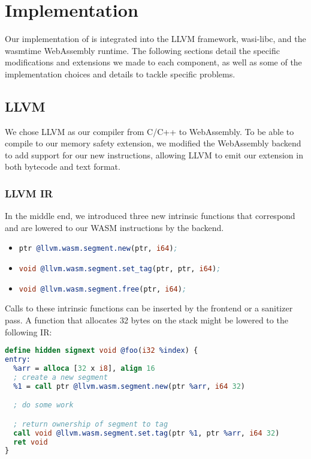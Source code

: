 \chapter{Implementation}
\label{ch:implementation}

Our implementation of \projectname{} is integrated into the LLVM framework, wasi-libc, and the wasmtime WebAssembly runtime.
The following sections detail the specific modifications and extensions we made to each component, as well as some of the implementation choices and details to tackle specific problems.

\section{LLVM}
\label{sec:llvm}

We chose LLVM as our compiler from C/C++ to WebAssembly.
To be able to compile to our memory safety extension, we modified the WebAssembly backend to add support for our new instructions, allowing LLVM to emit our extension in both bytecode and text format.

\subsection{LLVM IR}
\label{subsec:llvm-ir}

In the middle end, we introduced three new intrinsic functions that correspond and are lowered to our \ac{WASM} instructions by the backend.
\begin{itemize}
  \item \lstinline[style=customc,language=llvm]{ptr @llvm.wasm.segment.new(ptr, i64);}
  \item \lstinline[style=customc,language=llvm]{void @llvm.wasm.segment.set_tag(ptr, ptr, i64);}
  \item \lstinline[style=customc,language=llvm]{void @llvm.wasm.segment.free(ptr, i64);}
\end{itemize}
Calls to these intrinsic functions can be inserted by the frontend or a sanitizer pass.
A function that allocates 32 bytes on the stack might be lowered to the following IR:

\begin{lstlisting}[frame=h,style=customc,
    label={lst:llvm-intrinsics},language=llvm]
define hidden signext void @foo(i32 %index) {
entry:
  %arr = alloca [32 x i8], align 16
  ; create a new segment
  %1 = call ptr @llvm.wasm.segment.new(ptr %arr, i64 32)

  ; do some work

  ; return ownership of segment to tag
  call void @llvm.wasm.segment.set.tag(ptr %1, ptr %arr, i64 32)
  ret void
}
\end{lstlisting}

